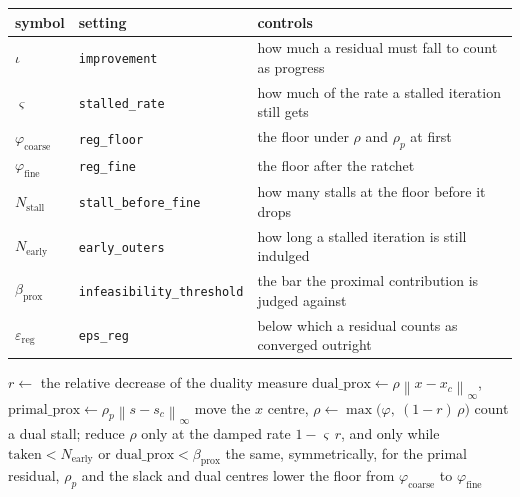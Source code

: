 \documentclass[a4paper,11pt]{book}
\theoremstyle{plain}
\theoremstyle{definition}
\theoremstyle{remark}
\numberwithin{equation}{chapter}
\numberwithin{algorithm}{chapter}
\newcommand{\norm}[1]{\left\|#1\right\|}
\begin{document}
	\begin{table}[H]
		\centering\small
		\begin{tabular}{lll}
			\toprule
			symbol & setting & controls\\
			\midrule
			$\iota$ & \texttt{improvement} & how much a residual must fall to count
			as progress\\
			$\varsigma$ & \texttt{stalled\_rate} & how much of the rate a stalled
			iteration still gets\\
			$\varphi_{\mathrm{coarse}}$ & \texttt{reg\_floor} & the floor under
			$\rho$ and $\rho_p$ at first\\
			$\varphi_{\mathrm{fine}}$ & \texttt{reg\_fine} & the floor after the
			ratchet\\
			$N_{\mathrm{stall}}$ & \texttt{stall\_before\_fine} & how many stalls
			at the floor before it drops\\
			$N_{\mathrm{early}}$ & \texttt{early\_outers} & how long a stalled
			iteration is still indulged\\
			$\beta_{\mathrm{prox}}$ & \texttt{infeasibility\_threshold} & the bar
			the proximal contribution is judged against\\
			$\varepsilon_{\mathrm{reg}}$ & \texttt{eps\_reg} & below which a
			residual counts as converged outright\\
			\bottomrule
		\end{tabular}
	\end{table}

	\begin{algorithm}[H]
		\caption{\texttt{interior}, one outer update}
		\begin{algorithmic}[1]
			\State $r\gets$ the relative decrease of the duality measure
			\State $\text{dual\_prox}\gets\rho\norm{x-x_c}_\infty$, \quad
			$\text{primal\_prox}\gets\rho_p\norm{s-s_c}_\infty$
			\State move the $x$ centre,\quad
			$\rho\gets\max\bigl(\varphi,\ (1-r)\,\rho\bigr)$
			\Else
			\State count a dual stall; reduce $\rho$ only at the damped rate
			$1-\varsigma\,r$, and only while $\text{taken}<N_{\mathrm{early}}$ or
			$\text{dual\_prox}<\beta_{\mathrm{prox}}$
			\EndIf
			\State the same, symmetrically, for the primal residual, $\rho_p$ and
			the slack and dual centres
			\State lower the floor from $\varphi_{\mathrm{coarse}}$ to
			$\varphi_{\mathrm{fine}}$
			\EndIf
		\end{algorithmic}
	\end{algorithm}
\end{document}
